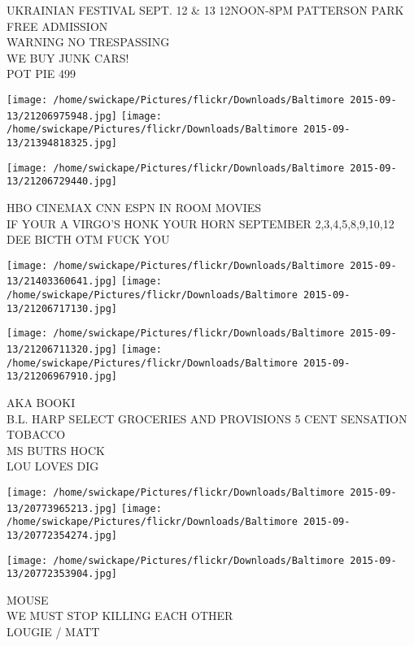 \documentclass[10pt,letterpaper]{article}
\begin{document}
UKRAINIAN FESTIVAL SEPT. 12 \& 13 12NOON{-}8PM PATTERSON PARK FREE ADMISSION\\
WARNING NO TRESPASSING\\
WE BUY JUNK CARS!\\
POT PIE 499\\
\pagebreak

\texttt{[image: /home/swickape/Pictures/flickr/Downloads/Baltimore 2015-09-13/21206975948.jpg]}
\texttt{[image: /home/swickape/Pictures/flickr/Downloads/Baltimore 2015-09-13/21394818325.jpg]}

\vspace{0.25in}
\texttt{[image: /home/swickape/Pictures/flickr/Downloads/Baltimore 2015-09-13/21206729440.jpg]}

HBO CINEMAX CNN ESPN IN ROOM MOVIES\\
IF YOUR A VIRGO'S HONK YOUR HORN SEPTEMBER 2,3,4,5,8,9,10,12\\
DEE BICTH OTM FUCK YOU\\
\pagebreak

\texttt{[image: /home/swickape/Pictures/flickr/Downloads/Baltimore 2015-09-13/21403360641.jpg]}
\texttt{[image: /home/swickape/Pictures/flickr/Downloads/Baltimore 2015-09-13/21206717130.jpg]}

\texttt{[image: /home/swickape/Pictures/flickr/Downloads/Baltimore 2015-09-13/21206711320.jpg]}
\texttt{[image: /home/swickape/Pictures/flickr/Downloads/Baltimore 2015-09-13/21206967910.jpg]}

AKA BOOKI\\
B.L. HARP SELECT GROCERIES AND PROVISIONS 5 CENT SENSATION TOBACCO\\
MS BUTRS HOCK\\
LOU LOVES DIG\\
\pagebreak

\texttt{[image: /home/swickape/Pictures/flickr/Downloads/Baltimore 2015-09-13/20773965213.jpg]}
\texttt{[image: /home/swickape/Pictures/flickr/Downloads/Baltimore 2015-09-13/20772354274.jpg]}

\vspace{0.25in}
\texttt{[image: /home/swickape/Pictures/flickr/Downloads/Baltimore 2015-09-13/20772353904.jpg]}

MOUSE\\
WE MUST STOP KILLING EACH OTHER\\
LOUGIE / MATT\\
\pagebreak
\end{document}
